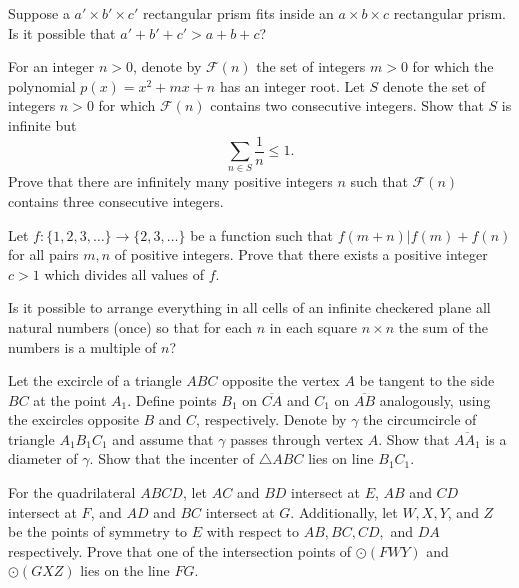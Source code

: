 \documentclass[11pt]{scrartcl}
\begin{document}
\begin{problem}[260804315613681]
  Suppose a $a' \times b' \times c'$ rectangular prism fits
  inside an $a \times b \times c$ rectangular prism.
  Is it possible that $a' + b' + c' > a + b + c$?
\end{problem}
\begin{problem}[69707766974981]
For an integer $n > 0$, denote by $\mathcal F(n)$ the set of integers $m > 0$ for which the polynomial $p(x) = x^2 + mx + n$ has an integer root.
Let $S$ denote the set of integers $n > 0$ for which $\mathcal F(n)$ contains two consecutive integers. Show that $S$ is infinite but\[ \sum_{n \in S} \frac 1n \le 1. \]
Prove that there are infinitely many positive integers $n$ such that $\mathcal F(n)$ contains three consecutive integers.
\end{problem}
\begin{problem}[208441124738479]
Let $f : \{ 1, 2, 3, \dots \} \to \{ 2, 3, \dots \}$ be a function such that $f(m + n) | f(m) + f(n) $ for all pairs $m,n$ of positive integers. Prove that there exists a positive integer $c > 1$ which divides all values of $f$.
\end{problem}
\begin{problem}[3048608408918882691]
	Is it possible to arrange everything in all cells of an infinite checkered plane all natural numbers (once) so that for each $n$ in each square $n \times n$ the sum of the numbers is a multiple of $n$?
\end{problem}
\begin{problem}[495587557940069]
Let the excircle of a triangle $ABC$ opposite the vertex $A$ be tangent to the side $BC$ at the point $A_1$. Define points $B_1$ on $\overline{CA}$ and $C_1$ on $\overline{AB}$ analogously, using the excircles opposite $B$ and $C$, respectively. Denote by $\gamma$ the circumcircle of triangle $A_1B_1C_1$ and assume that $\gamma$ passes through vertex $A$.
Show that $\overline{AA_1}$ is a diameter of $\gamma$.
Show that the incenter of $\triangle ABC$ lies on line $B_1C_1$.
\end{problem}
\begin{problem}[436681276656848]
For the quadrilateral $ABCD$, let $AC$ and $BD$ intersect at $E$, $AB$ and $CD$ intersect at $F$, and $AD$ and $BC$ intersect at $G$. Additionally, let $W, X, Y$, and $Z$ be the points of symmetry to $E$ with respect to $AB, BC, CD,$ and $DA$ respectively. Prove that one of the intersection points of $\odot(FWY)$ and $\odot(GXZ)$ lies on the line $FG$.
\end{problem}
\end{document}
